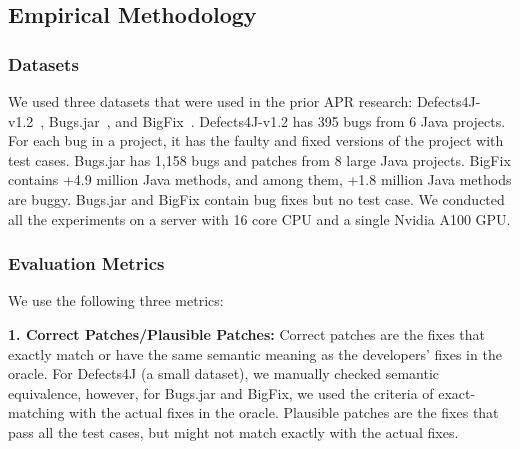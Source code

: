 \subsection{Empirical Methodology}
\label{eval-methodology:sec}

\subsubsection{Datasets}
We used three datasets that were used in the prior APR research:
Defects4J-v1.2~\cite{defects4j}, Bugs.jar~\cite{saha2018bugs}, and
BigFix~\cite{yioopsla19}. Defects4J-v1.2 has 395 bugs from 6 Java
projects. For each bug in a project, it has the faulty and fixed
versions of the project with test cases. Bugs.jar has 1,158 bugs and
patches from 8 large Java projects. BigFix contains +4.9 million Java
methods, and among them, +1.8 million Java methods are buggy. Bugs.jar
and BigFix contain bug fixes but no test case. We conducted all the
experiments on a server with 16 core CPU and a single Nvidia A100 GPU.


\subsubsection{Evaluation Metrics}

We use the following three metrics:


{\bf 1. Correct Patches/Plausible Patches:} Correct patches are the
fixes that exactly match or have the same semantic meaning as the
developers' fixes in the oracle. For Defects4J (a small dataset), we
manually checked semantic equivalence, however, for Bugs.jar and
BigFix, we used the criteria of exact-matching with the actual
fixes in the oracle.
%
Plausible patches are the fixes that pass all the test cases, but
might not match exactly with the actual fixes.

